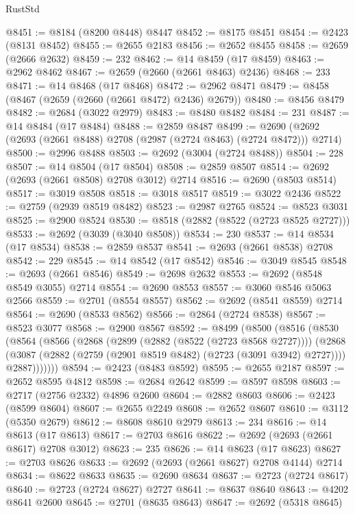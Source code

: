 \begin{lexlean}{RustStd}
\begin{coremodule}
@8451 := @8184 (@8200 @8448) @8447
@8452 := @8175 @8451
@8454 := @2423 (@8131 @8452)
@8455 := @2655 @2183
@8456 := @2652 @8455
@8458 := @2659 (@2666 @2632)
@8459 := 232
@8462 := @14 @8459 (@17 @8459)
@8463 := @2962 @8462
@8467 := @2659 (@2660 (@2661 @8463) @2436)
@8468 := 233
@8471 := @14 @8468 (@17 @8468)
@8472 := @2962 @8471
@8479 := @8458 (@8467 (@2659 (@2660 (@2661 @8472) @2436) @2679))
@8480 := @8456 @8479
@8482 := @2684 (@3022 @2979)
@8483 := @8480 @8482
@8484 := 231
@8487 := @14 @8484 (@17 @8484)
@8488 := @2859 @8487
@8499 := @2690 (@2692 (@2693 (@2661 @8488) @2708 (@2987 (@2724 @8463) (@2724 @8472))) @2714)
@8500 := @2996 @8488
@8503 := @2692 (@3004 (@2724 @8488))
@8504 := 228
@8507 := @14 @8504 (@17 @8504)
@8508 := @2859 @8507
@8514 := @2692 (@2693 (@2661 @8508) @2708 @3012) @2714
@8516 := @2690 (@8503 @8514)
@8517 := @3019 @8508
@8518 := @3018 @8517
@8519 := @3022 @2436
@8522 := @2759 (@2939 @8519 @8482)
@8523 := @2987 @2765
@8524 := @8523 @3031
@8525 := @2900 @8524
@8530 := @8518 (@2882 (@8522 (@2723 @8525 @2727)))
@8533 := @2692 (@3039 (@3040 @8508))
@8534 := 230
@8537 := @14 @8534 (@17 @8534)
@8538 := @2859 @8537
@8541 := @2693 (@2661 @8538) @2708
@8542 := 229
@8545 := @14 @8542 (@17 @8542)
@8546 := @3049 @8545
@8548 := @2693 (@2661 @8546)
@8549 := @2698 @2632
@8553 := @2692 (@8548 @8549 @3055) @2714
@8554 := @2690 @8553
@8557 := @3060 @8546 @5063 @2566
@8559 := @2701 (@8554 @8557)
@8562 := @2692 (@8541 @8559) @2714
@8564 := @2690 (@8533 @8562)
@8566 := @2864 (@2724 @8538)
@8567 := @8523 @3077
@8568 := @2900 @8567
@8592 := @8499
    (@8500
      (@8516
        (@8530
          (@8564
            (@8566
              (@2868
                (@2899 (@2882 (@8522 (@2723 @8568 @2727))))
                (@2868
                  (@3087 (@2882 (@2759 (@2901 @8519 @8482) (@2723 (@3091 @3942) @2727))))
                  @2887)))))))
@8594 := @2423 (@8483 @8592)
@8595 := @2655 @2187
@8597 := @2652 @8595 @4812
@8598 := @2684 @2642
@8599 := @8597 @8598
@8603 := @2717 (@2756 @2332) @4896 @2600
@8604 := @2882 @8603
@8606 := @2423 (@8599 @8604)
@8607 := @2655 @2249
@8608 := @2652 @8607
@8610 := @3112 (@5350 @2679)
@8612 := @8608 @8610 @2979
@8613 := 234
@8616 := @14 @8613 (@17 @8613)
@8617 := @2703 @8616
@8622 := @2692 (@2693 (@2661 @8617) @2708 @3012)
@8623 := 235
@8626 := @14 @8623 (@17 @8623)
@8627 := @2703 @8626
@8633 := @2692 (@2693 (@2661 @8627) @2708 @4144) @2714
@8634 := @8622 @8633
@8635 := @2690 @8634
@8637 := @2723 (@2724 @8617)
@8640 := @2723 (@2724 @8627) @2727
@8641 := @8637 @8640
@8643 := @4202 @8641 @2600
@8645 := @2701 (@8635 @8643)
@8647 := @2692 (@5318 @8645)

\end{coremodule}
\end{lexlean}
